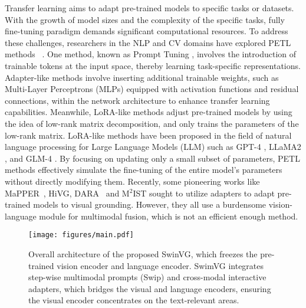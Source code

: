 Transfer learning aims to adapt pre-trained models to specific tasks or datasets. With the growth of model sizes and the complexity of the specific tasks, fully fine-tuning paradigm demands significant computational resources. To address these challenges, researchers in the NLP and CV domains have explored PETL methods ~\cite{lester2021power,hu2021lora,chen2022adaptformer,yuan2023mrsadapter,zhou2024dynamic}. One method, known as Prompt Tuning \cite{wang2023aprompt,khattak2023maple,liu2024dap}, involves the introduction of trainable tokens at the input space, thereby learning task-specific representations. Adapter-like methods \cite{yuan2023mrsadapter,liu2024sparse} involve inserting additional trainable weights, such as Multi-Layer Perceptrons (MLPs) equipped with activation functions and residual connections, within the network architecture to enhance transfer learning capabilities. Meanwhile, LoRA-like methods \cite{hu2021lora} adjust pre-trained models by using the idea of low-rank matrix decomposition, and only trains the parameters of the low-rank matrix. LoRA-like methods have been proposed in the field of natural language processing for Large Language Models (LLM) such as GPT-4 \cite{achiam2023gpt}, LLaMA2 \cite{touvron2023llama}, and GLM-4 \cite{glm2024chatglm}. By focusing on updating only a small subset of parameters, PETL methods effectively simulate the fine-tuning of the entire model’s parameters without directly modifying them. Recently, some pioneering works like MaPPER~\cite{liu2024mapper}, HiVG\cite{xiao2024hivg}, DARA~\cite{liu2024dara} and M$^2$IST \cite{liu2024m} sought to utilize adapters to adapt pre-trained models to visual grounding. However, they all use a burdensome vision-language module for multimodal fusion, which is not an efficient enough method. 




\begin{figure*}[t!]
\centering
\texttt{[image: figures/main.pdf]}
\caption{Overall architecture of the proposed SwinVG, which freezes the pre-trained vision encoder and language encoder. SwimVG integrates step-wise multimodal prompts (Swip) and cross-modal interactive adapters, which bridges the visual and language encoders, ensuring the visual encoder concentrates on the text-relevant areas.}
\label{fig:overview}
\end{figure*}





